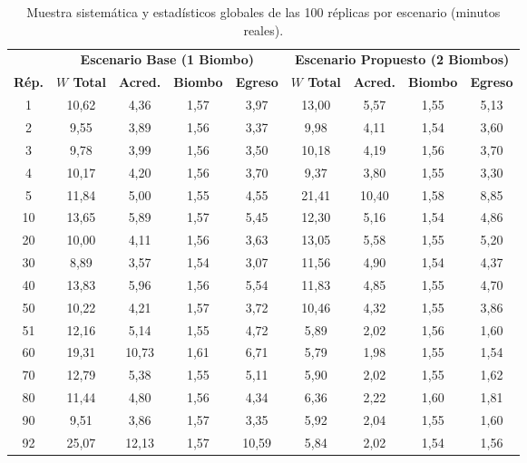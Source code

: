 \documentclass[11pt,a4paper]{article}
\begin{document}
\begin{table}[H]
    \centering
    \footnotesize
    \setlength{\tabcolsep}{4pt}
    \caption{Muestra sistemática y estadísticos globales de las 100 réplicas por escenario (minutos reales).}
    \label{tab:detalle_replicas}
    \begin{tabular}{ccccccccc}
        \toprule
        & \multicolumn{4}{c}{\textbf{Escenario Base (1 Biombo)}} & \multicolumn{4}{c}{\textbf{Escenario Propuesto (2 Biombos)}} \\
        \cmidrule(lr){2-5} \cmidrule(lr){6-9}
        \textbf{Rép.} & \textbf{$W$ Total} & \textbf{Acred.} & \textbf{Biombo} & \textbf{Egreso} & \textbf{$W$ Total} & \textbf{Acred.} & \textbf{Biombo} & \textbf{Egreso} \\
        \midrule
        1   & 10,62 & 4,36 & 1,57 & 3,97 & 13,00 & 5,57 & 1,55 & 5,13 \\
        2   & 9,55  & 3,89 & 1,56 & 3,37 & 9,98  & 4,11 & 1,54 & 3,60 \\
        3   & 9,78  & 3,99 & 1,56 & 3,50 & 10,18 & 4,19 & 1,56 & 3,70 \\
        4   & 10,17 & 4,20 & 1,56 & 3,70 & 9,37  & 3,80 & 1,55 & 3,30 \\
        5   & 11,84 & 5,00 & 1,55 & 4,55 & 21,41 & 10,40 & 1,58 & 8,85 \\
        10  & 13,65 & 5,89 & 1,57 & 5,45 & 12,30 & 5,16 & 1,54 & 4,86 \\
        20  & 10,00 & 4,11 & 1,56 & 3,63 & 13,05 & 5,58 & 1,55 & 5,20 \\
        30  & 8,89  & 3,57 & 1,54 & 3,07 & 11,56 & 4,90 & 1,54 & 4,37 \\
        40  & 13,83 & 5,96 & 1,56 & 5,54 & 11,83 & 4,85 & 1,55 & 4,70 \\
        50  & 10,22 & 4,21 & 1,57 & 3,72 & 10,46 & 4,32 & 1,55 & 3,86 \\
        51  & 12,16 & 5,14 & 1,55 & 4,72 & 5,89  & 2,02 & 1,56 & 1,60 \\
        60  & 19,31 & 10,73 & 1,61 & 6,71 & 5,79  & 1,98 & 1,55 & 1,54 \\
        70  & 12,79 & 5,38 & 1,55 & 5,11 & 5,90  & 2,02 & 1,55 & 1,62 \\
        80  & 11,44 & 4,80 & 1,56 & 4,34 & 6,36  & 2,22 & 1,60 & 1,81 \\
        90  & 9,51  & 3,86 & 1,57 & 3,35 & 5,92  & 2,04 & 1,55 & 1,60 \\
        92  & 25,07 & 12,13 & 1,57 & 10,59 & 5,84 & 2,02 & 1,54 & 1,56 \\

\end{tabular}
\end{table}
\end{document}

